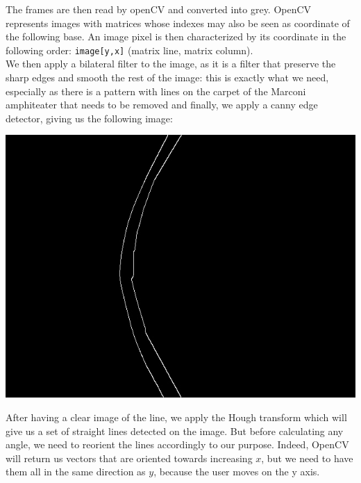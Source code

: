 \documentclass{rapport}
\begin{document}
\begin{center}
\end{center}
The frames are then read by openCV and converted into grey. OpenCV represents images with matrices whose indexes may also be seen as coordinate of the following base. An image pixel is then characterized by its coordinate in the following order: \verb|image[y,x]| (matrix line, matrix column).\\We then apply a bilateral filter to the image, as it is a filter that preserve the sharp edges and smooth the rest of the image: this is exactly what we need, especially as there is a pattern with lines on the carpet of the Marconi amphiteater that needs to be removed and finally, we apply a canny edge detector, giving us the following image:\\
\begin{center}
\includegraphics[width=0.35\linewidth]{canny_edge.jpg}
\end{center}
After having a clear image of the line, we apply the Hough transform which will give us a set of straight lines detected on the image. But before calculating any angle, we need to reorient the lines accordingly to our purpose. Indeed, OpenCV will return us vectors that are oriented towards increasing \(x\), but we need to have them all in the same direction as \(y\), because the user moves on the y axis.
\end{document}
